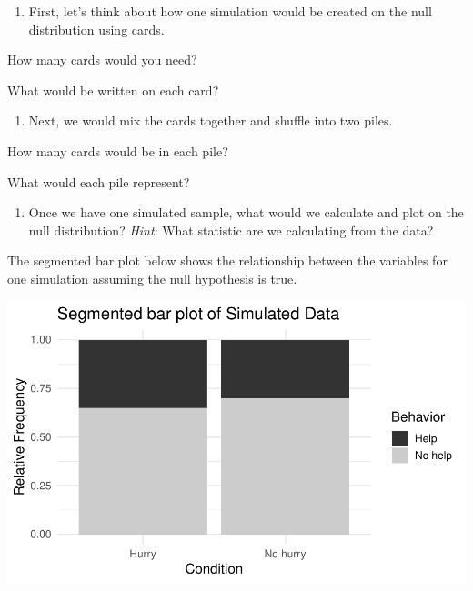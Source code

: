 \documentclass[
]{report}
\providecommand{\tightlist}{%
  \setlength{\itemsep}{0pt}\setlength{\parskip}{0pt}}
\newcommand{\rgi}{\hspace{24pt}}  %
\begin{document}
\begin{enumerate}
\def\labelenumi{\arabic{enumi}.}
\setcounter{enumi}{12}
\tightlist
\item
  First, let's think about how one simulation would be created on the null distribution using cards.
\end{enumerate}

\rgi How many cards would you need?
\vspace{0.1in}

\rgi What would be written on each card?

\vspace{0.5in}

\begin{enumerate}
\def\labelenumi{\arabic{enumi}.}
\setcounter{enumi}{13}
\tightlist
\item
  Next, we would mix the cards together and shuffle into two piles.
\end{enumerate}

\rgi How many cards would be in each pile?
\vspace{0.1in}

\rgi What would each pile represent?
\vspace{0.5in}

\begin{enumerate}
\def\labelenumi{\arabic{enumi}.}
\setcounter{enumi}{14}
\tightlist
\item
  Once we have one simulated sample, what would we calculate and plot on the null distribution? \emph{Hint}: What statistic are we calculating from the data?
\end{enumerate}

\vspace{0.8in}

The segmented bar plot below shows the relationship between the variables for one simulation assuming the null hypothesis is true.

\begin{center}\includegraphics[width=0.8\linewidth]{08-OCA06-inference-2cat-simulation_files/figure-latex/unnamed-chunk-3-1} \end{center}
\end{document}
